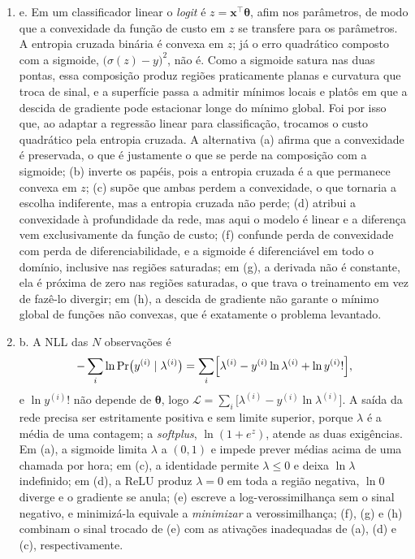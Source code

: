\documentclass{dlproblemset}
\begin{document}
\begin{enumerate}[1)]
    \item e. Em um classificador linear o \textit{logit} é $z = \mathbf{x}^{\top}\boldsymbol{\theta}$, afim nos parâmetros, de modo que a convexidade da função de custo em $z$ se transfere para os parâmetros. A entropia cruzada binária é convexa em $z$; já o erro quadrático composto com a sigmoide, $\bigl(\sigma(z) - y\bigr)^2$, não é. Como a sigmoide satura nas duas pontas, essa composição produz regiões praticamente planas e curvatura que troca de sinal, e a superfície passa a admitir mínimos locais e platôs em que a descida de gradiente pode estacionar longe do mínimo global. Foi por isso que, ao adaptar a regressão linear para classificação, trocamos o custo quadrático pela entropia cruzada. A alternativa (a) afirma que a convexidade é preservada, o que é justamente o que se perde na composição com a sigmoide; (b) inverte os papéis, pois a entropia cruzada é a que permanece convexa em $z$; (c) supõe que ambas perdem a convexidade, o que tornaria a escolha indiferente, mas a entropia cruzada não perde; (d) atribui a convexidade à profundidade da rede, mas aqui o modelo é linear e a diferença vem exclusivamente da função de custo; (f) confunde perda de convexidade com perda de diferenciabilidade, e a sigmoide é diferenciável em todo o domínio, inclusive nas regiões saturadas; em (g), a derivada não é constante, ela é próxima de zero nas regiões saturadas, o que trava o treinamento em vez de fazê-lo divergir; em (h), a descida de gradiente não garante o mínimo global de funções não convexas, que é exatamente o problema levantado.

    \item b. A NLL das $N$ observações é
    \[
    -\sum_{i}\ln\Pr\bigl(y^{(i)} \mid \lambda^{(i)}\bigr) = \sum_{i}\Bigl[\lambda^{(i)} - y^{(i)}\ln\lambda^{(i)} + \ln y^{(i)}!\Bigr],
    \]
    e $\ln y^{(i)}!$ não depende de $\boldsymbol{\theta}$, logo $\mathcal{L} = \sum_i\bigl[\lambda^{(i)} - y^{(i)}\ln\lambda^{(i)}\bigr]$. A saída da rede precisa ser estritamente positiva e sem limite superior, porque $\lambda$ é a média de uma contagem; a \textit{softplus}, $\ln(1 + e^{z})$, atende as duas exigências. Em (a), a sigmoide limita $\lambda$ a $(0, 1)$ e impede prever médias acima de uma chamada por hora; em (c), a identidade permite $\lambda \leq 0$ e deixa $\ln\lambda$ indefinido; em (d), a ReLU produz $\lambda = 0$ em toda a região negativa, $\ln 0$ diverge e o gradiente se anula; (e) escreve a log-verossimilhança sem o sinal negativo, e minimizá-la equivale a \emph{minimizar} a verossimilhança; (f), (g) e (h) combinam o sinal trocado de (e) com as ativações inadequadas de (a), (d) e (c), respectivamente.


\end{enumerate}
\end{document}
